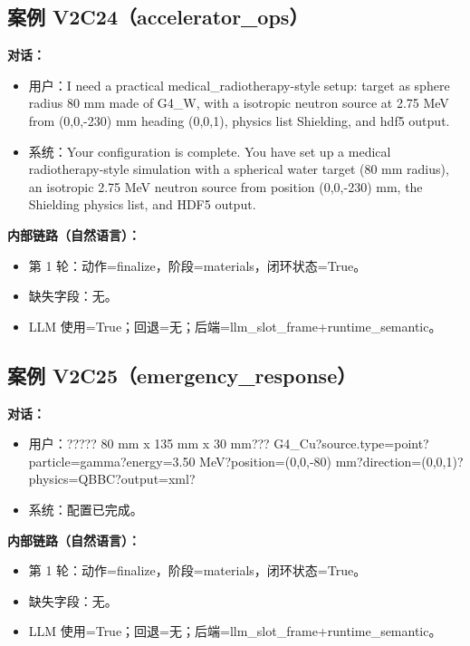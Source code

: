 \documentclass[11pt]{ctexart}
\begin{document}
\subsection{案例 V2C24（accelerator\_ops）}
\textbf{对话：}
\begin{itemize}
\item 用户：I need a practical medical\_radiotherapy-style setup: target as sphere radius 80 mm made of G4\_W, with a isotropic neutron source at 2.75 MeV from (0,0,-230) mm heading (0,0,1), physics list Shielding, and hdf5 output.
\item 系统：Your configuration is complete. You have set up a medical radiotherapy-style simulation with a spherical water target (80 mm radius), an isotropic 2.75 MeV neutron source from position (0,0,-230) mm, the Shielding physics list, and HDF5 output.
\end{itemize}
\textbf{内部链路（自然语言）：}
\begin{itemize}
\item 第 1 轮：动作=finalize，阶段=materials，闭环状态=True。
\item 缺失字段：无。
\item LLM 使用=True；回退=无；后端=llm\_slot\_frame+runtime\_semantic。
\end{itemize}
\subsection{案例 V2C25（emergency\_response）}
\textbf{对话：}
\begin{itemize}
\item 用户：????? 80 mm x 135 mm x 30 mm??? G4\_Cu?source.type=point?particle=gamma?energy=3.50 MeV?position=(0,0,-80) mm?direction=(0,0,1)?physics=QBBC?output=xml?
\item 系统：配置已完成。
\end{itemize}
\textbf{内部链路（自然语言）：}
\begin{itemize}
\item 第 1 轮：动作=finalize，阶段=materials，闭环状态=True。
\item 缺失字段：无。
\item LLM 使用=True；回退=无；后端=llm\_slot\_frame+runtime\_semantic。
\end{itemize}
\end{document}
